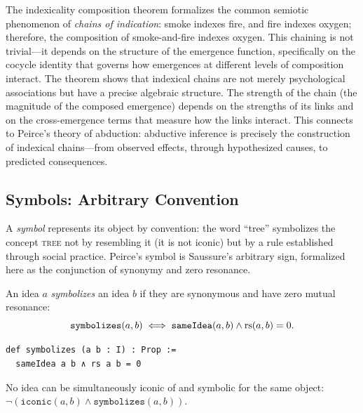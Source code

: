 \begin{interpretation}
The indexicality composition theorem formalizes the common semiotic phenomenon of \emph{chains of indication}: smoke indexes fire, and fire indexes oxygen; therefore, the composition of smoke-and-fire indexes oxygen. This chaining is not trivial---it depends on the structure of the emergence function, specifically on the cocycle identity that governs how emergences at different levels of composition interact. The theorem shows that indexical chains are not merely psychological associations but have a precise algebraic structure. The strength of the chain (the magnitude of the composed emergence) depends on the strengths of its links and on the cross-emergence terms that measure how the links interact. This connects to Peirce's theory of abduction: abductive inference is precisely the construction of indexical chains---from observed effects, through hypothesized causes, to predicted consequences.
\end{interpretation}

\subsection{Symbols: Arbitrary Convention}

A \emph{symbol} represents its object by convention: the word ``tree''
symbolizes the concept \textsc{tree} not by resembling it (it is not
iconic) but by a rule established through social practice. Peirce's
symbol is Saussure's arbitrary sign, formalized here as the conjunction
of synonymy and zero resonance.

\begin{definition}
\label{def:symbolizes}
An idea $a$ \emph{symbolizes} an idea $b$ if they are synonymous and
have zero mutual resonance:
\[
  \texttt{symbolizes}(a, b) \iff
  \texttt{sameIdea}(a, b) \wedge \mathrm{rs}(a, b) = 0.
\]
\end{definition}

\begin{lstlisting}[caption={Symbols: arbitrary connection}]
def symbolizes (a b : I) : Prop :=
  sameIdea a b ∧ rs a b = 0
\end{lstlisting}

\begin{theorem}
\label{thm:icon-symbol-exclusive}
No idea can be simultaneously iconic of and symbolic for the same
object: $\neg(\texttt{iconic}(a, b) \wedge \texttt{symbolizes}(a, b))$.
\end{theorem}

